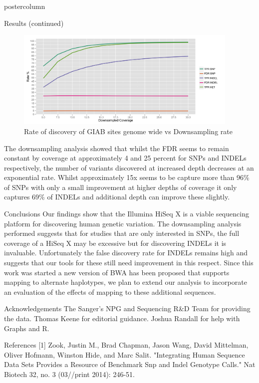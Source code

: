 \documentclass[final]{beamer}
\begin{document}
\begin{frame}{}
\begin{columns}
\begin{column}{.49\textwidth}
\begin{beamercolorbox}[center,wd=\textwidth]{postercolumn}
\begin{minipage}[T]{.95\textwidth}
\begin{block}{Results (continued)}
                \begin{figure}
                \includegraphics[width=0.95\textwidth]{images/downsampling_fig1}
                \caption{Rate of discovery of GIAB sites genome wide vs Downsampling rate}
                \end{figure}

                The downsampling analysis showed that whilst the FDR seems to remain constant by coverage at approximately 4 and 25 percent for SNPs and INDELs respectively, the number of variants discovered at increased depth decreases at an exponential rate.  Whilst approximately 15x seems to be capture more than 96\% of SNPs with only a small improvement at higher depths of coverage it only captures 69\% of INDELs and additional depth can improve these slightly.

            \end{block}
            \begin{block}{Conclusions}
                Our findings show that the Illumina HiSeq X is a viable sequencing platform for discovering human genetic variation.  The downsampling analysis performed suggests that for studies that are only interested in SNPs, the full coverage of a HiSeq X may be excessive but for discovering INDELs it is invaluable. Unfortunately the false discovery rate for INDELs remains high and suggests that our tools for these still need improvement in this respect. Since this work was started a new version of BWA has been proposed that supports mapping to alternate haplotypes, we plan to extend our analysis to incorporate an evaluation of the effects of mapping to these additional sequences.
            \end{block}
            \begin{block}{Acknowledgements}
                The Sanger's NPG and Sequencing R\&D Team for providing the data. Thomas Keene for editorial guidance. Joshua Randall for help with Graphs and R.
            \end{block}
            \begin{block}{References}
                [1] Zook, Justin M., Brad Chapman, Jason Wang, David Mittelman, Oliver Hofmann, Winston Hide, and Marc Salit. "Integrating Human Sequence Data Sets Provides a Resource of Benchmark Snp and Indel Genotype Calls." Nat Biotech 32, no. 3 (03//print 2014): 246-51.
            \end{block}
            \vfill


\end{minipage}
\end{beamercolorbox}
\end{column}
\end{columns}
\end{frame}
\end{document}

